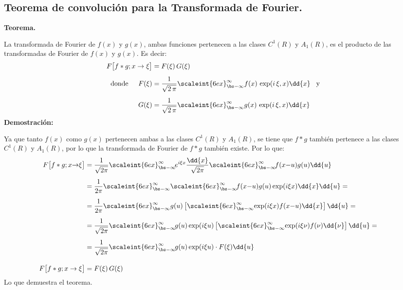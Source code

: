 \subsection{Teorema de convolución para la Transformada de Fourier.}

\textbf{Teorema.}

La transformada de Fourier de $f(x)$ y $g(x)$, ambas funciones pertenecen a las clases $C^{1}(R)$ y $A_{1}(R)$, es el producto de las transformadas de Fourier de $f(x)$ y $g(x)$. Es decir:
\begin{align*}
F \big[f * g; x \to \xi \big] &= F(\xi) \, G(\xi) \\[0.5em]
\mbox{donde } \hspace{0.4cm} F(\xi) &= \dfrac{1}{\sqrt{2 \, \pi}} \scaleint{6ex}_{\bs -\infty}^{\infty} f(x) \, \exp(i \, \xi, x) \dd{x} \hspace{0.3cm} \mbox{y} \\[0.5em]
G(\xi) &= \dfrac{1}{\sqrt{2 \, \pi}} \scaleint{6ex}_{\bs -\infty}^{\infty} g(x) \, \exp(i \, \xi, x) \dd{x}
\end{align*}
\textbf{Demostración: }

Ya que tanto $f(x)$ como $g(x)$ pertenecen ambas a las clases $C^{1}(R)$ y $A_{1}(R)$, se tiene que $f * g$ también pertenece a las clases $C^{1}(R)$ y $A_{1}(R)$, por lo que la transformada de Fourier de $f * g$ también existe. Por lo que:
\begin{align}
\hspace*{-0.5cm}
\begin{aligned}[b]
F \big[f * g; x {\to} \xi \big] &= \dfrac{1}{\sqrt{2 \pi}} \scaleint{6ex}_{\bs -\infty}^{\infty} \! e^{i  \xi x} \dfrac{\dd{x}}{\sqrt{2 \pi}} \scaleint{6ex}_{\bs -\infty}^{\infty} \! f(x {-} u) g(u) \dd{u} \\[0.5em]
&= \dfrac{1}{2 \pi} \scaleint{6ex}_{\bs -\infty}^{\infty} \scaleint{6ex}_{\bs -\infty}^{\infty} \! f(x {-} u) g(u) \exp(i \xi x) \dd{x} \dd{u} = \\[0.5em]
&= \dfrac{1}{2 \pi} \scaleint{6ex}_{\bs -\infty}^{\infty} g(u) \left[ \scaleint{6ex}_{\bs -\infty}^{\infty} \! \exp(i \xi x) f(x {-} u) \dd{x} \right] \dd{u} = \\[0.5em]
&= \dfrac{1}{\sqrt{2  \pi}} \scaleint{6ex}_{\bs -\infty}^{\infty} \! g(u) \exp(i \xi u) \left[ \scaleint{6ex}_{\bs -\infty}^{\infty} \! \exp(i \xi \nu) f(\nu) \dd{\nu} \right] \dd{u} = \\[0.5em]
&= \dfrac{1}{\sqrt{2 \pi}} \scaleint{6ex}_{\bs -\infty}^{\infty} \! g(u) \exp(i  \xi u) \cdot F(\xi) \dd{u} \\[1em]
F \big[f * g; x \to \xi \big] &= F(\xi) \, G(\xi)
\end{aligned}
\label{eq:ecuacion_01_24}
\end{align}
Lo que demuestra el teorema.
\\
\bigskip

